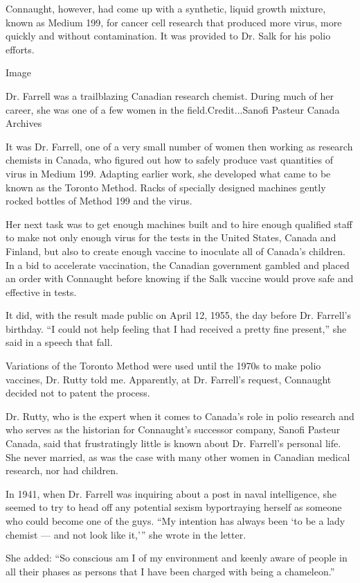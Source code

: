 Connaught, however, had come up with a synthetic, liquid growth mixture,
known as Medium 199, for cancer cell research that produced more virus,
more quickly and without contamination. It was provided to Dr. Salk for
his polio efforts.

Image

Dr. Farrell was a trailblazing Canadian research chemist. During much of
her career, she was one of a few women in the field.Credit...Sanofi
Pasteur Canada Archives

It was Dr. Farrell, one of a very small number of women then working as
research chemists in Canada, who figured out how to safely produce vast
quantities of virus in Medium 199. Adapting earlier work, she developed
what came to be known as the Toronto Method. Racks of specially designed
machines gently rocked bottles of Method 199 and the virus.

Her next task was to get enough machines built and to hire enough
qualified staff to make not only enough virus for the tests in the
United States, Canada and Finland, but also to create enough vaccine to
inoculate all of Canada's children. In a bid to accelerate vaccination,
the Canadian government gambled and placed an order with Connaught
before knowing if the Salk vaccine would prove safe and effective in
tests.

It did, with the result made public on April 12, 1955, the day before
Dr. Farrell's birthday. ``I could not help feeling that I had received a
pretty fine present,'' she said in a speech that fall.

Variations of the Toronto Method were used until the 1970s to make polio
vaccines, Dr. Rutty told me. Apparently, at Dr. Farrell's request,
Connaught decided not to patent the process.

Dr. Rutty, who is the expert when it comes to Canada's role in polio
research and who serves as the historian for Connaught's successor
company, Sanofi Pasteur Canada, said that frustratingly little is known
about Dr. Farrell's personal life. She never married, as was the case
with many other women in Canadian medical research, nor had children.

In 1941, when Dr. Farrell was inquiring about a post in naval
intelligence, she seemed to try to head off any potential sexism
byportraying herself as someone who could become one of the guys. ``My
intention has always been `to be a lady chemist --- and not look like
it,''' she wrote in the letter.

She added: ``So conscious am I of my environment and keenly aware of
people in all their phases as persons that I have been charged with
being a chameleon.''

